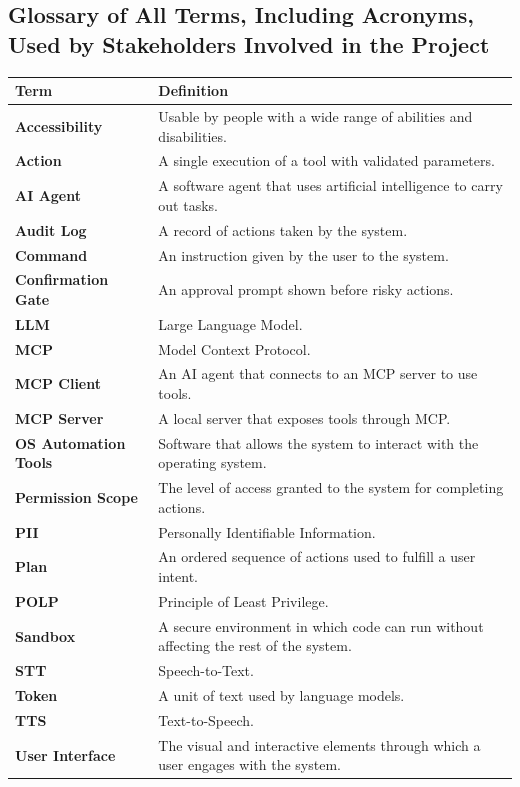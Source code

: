 \documentclass[12pt]{article}
\begin{document}
\subsection{Glossary of All Terms, Including Acronyms, Used by
Stakeholders Involved in the Project}

\begin{tabularx}{\textwidth}{p{3.8cm}X}
\toprule
\textbf{Term} & \textbf{Definition} \\
\midrule
\textbf{Accessibility} & Usable by people with a wide range of
abilities and disabilities. \\
\textbf{Action} & A single execution of a tool with validated parameters. \\
\textbf{AI Agent} & A software agent that uses artificial intelligence
to carry out tasks. \\
\textbf{Audit Log} & A record of actions taken by the system. \\
\textbf{Command} & An instruction given by the user to the system. \\
\textbf{Confirmation Gate} & An approval prompt shown before risky actions. \\
\textbf{LLM} & Large Language Model. \\
\textbf{MCP} & Model Context Protocol. \\
\textbf{MCP Client} & An AI agent that connects to an MCP server to
use tools. \\
\textbf{MCP Server} & A local server that exposes tools through MCP. \\
\textbf{OS Automation Tools} & Software that allows the system to
interact with the operating system. \\
\textbf{Permission Scope} & The level of access granted to the system
for completing actions. \\
\textbf{PII} & Personally Identifiable Information. \\
\textbf{Plan} & An ordered sequence of actions used to fulfill a user intent. \\
\textbf{POLP} & Principle of Least Privilege. \\
\textbf{Sandbox} & A secure environment in which code can run without
affecting the rest of the system. \\
\textbf{STT} & Speech-to-Text. \\
\textbf{Token} & A unit of text used by language models. \\
\textbf{TTS} & Text-to-Speech. \\
\textbf{User Interface} & The visual and interactive elements through
which a user engages with the system. \\
\bottomrule
\end{tabularx}
\end{document}
